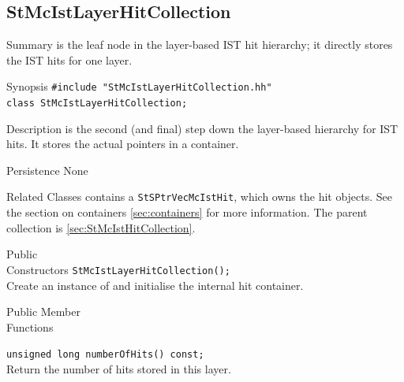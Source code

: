 %
%
\subsection{StMcIstLayerHitCollection}
 
\label{sec:StMcIstLayerHitCollection}
\begin{Entry}
\item[Summary]
     is the leaf node in the
    layer-based IST hit hierarchy; it directly stores the IST hits for
    one layer.

\item[Synopsis]
    \verb+#include "StMcIstLayerHitCollection.hh"+\\
    \verb+class StMcIstLayerHitCollection;+\\

\item[Description]
     is the second (and final) step down
    the layer-based hierarchy for IST hits.  It stores the actual
     pointers in a  container.

\item[Persistence]
    None

\item[Related Classes]
     contains a
    {\tt StSPtrVecMcIstHit}, which owns the hit objects.  See the
    section on containers \ref{sec:containers} for more information.
    The parent collection is
     \ref{sec:StMcIstHitCollection}.

\item[Public\\ Constructors]
    \verb+StMcIstLayerHitCollection();+\\
    Create an instance of  and
    initialise the internal hit container.

\item[Public Member\\ Functions]

    \verb+unsigned long numberOfHits() const;+\\
    Return the number of hits stored in this layer.


\end{Entry}
